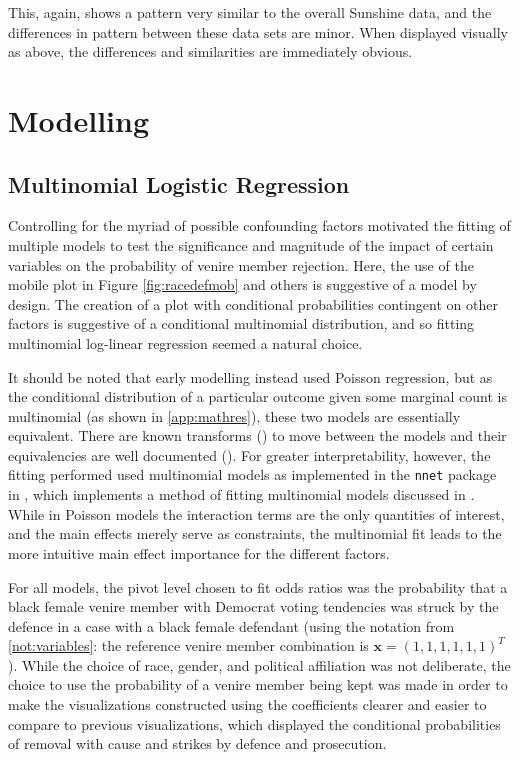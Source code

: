This, again, shows a pattern very similar to the overall Sunshine data, and the differences in pattern between these data sets are
minor. When displayed visually as above, the differences and similarities are immediately obvious.

\section{Modelling} \label{sec:mods}

\subsection{Multinomial Logistic Regression}

Controlling for the myriad of possible confounding factors motivated the fitting of multiple models to test the significance and
magnitude of the impact of certain variables on the probability of venire member rejection. Here, the use of the mobile plot in
Figure \ref{fig:racedefmob} and others is suggestive of a model by design. The creation of a plot with conditional probabilities
contingent on other factors is suggestive of a conditional multinomial distribution, and so fitting multinomial log-linear
regression seemed a natural choice.

It should be noted that early modelling instead used Poisson regression, but as the conditional distribution of a particular
outcome given some marginal count is multinomial (as shown in \ref{app:mathres}), these two models are essentially
equivalent. There are known transforms (\cite{baker1994}) to move between the models and their equivalencies are well documented
(\cite{lang1996}). For greater interpretability, however, the fitting performed used multinomial models as implemented in the
\texttt{nnet} package in \Rp, which implements a method of fitting multinomial models discussed in \cite{nnet}. While in Poisson
models the interaction terms are the only quantities of interest, and the main effects merely serve as constraints, the
multinomial fit leads to the more intuitive main effect importance for the different factors.

For all models, the pivot level chosen to fit odds ratios was the probability that a black female venire member with Democrat
voting tendencies was struck by the defence in a case with a black female defendant (using the notation from \ref{not:variables}:
the reference venire member combination is $\mathbf{x} = (1,1,1,1,1,1)^T$). While the choice of race, gender, and political
affiliation was not deliberate, the choice to use the probability of a venire member being kept was made in order to make the
visualizations constructed using the coefficients clearer and easier to compare to previous visualizations, which displayed the
conditional probabilities of removal with cause and strikes by defence and prosecution.


